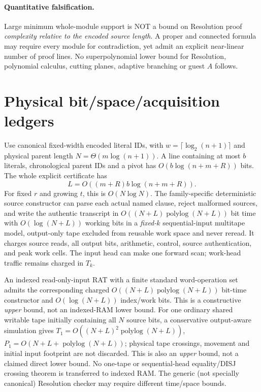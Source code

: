 \documentclass[11pt]{article}
\begin{document}
\paragraph{Quantitative falsification.}
Large minimum whole-module support is NOT a bound
on Resolution proof \emph{complexity relative to the
encoded source length}. A proper and connected
formula may require every module for contradiction,
yet admit an explicit near-linear number of proof lines.
No superpolynomial lower bound for Resolution,
polynomial calculus, cutting planes, adaptive branching
or guest $A$ follows.

\section{Physical bit/space/acquisition ledgers}
Use canonical fixed-width encoded literal IDs, with
$w=\lceil\log_2(n+1)\rceil$ and physical parent length
$N=\Theta(m\log(n+1))$.  A line containing at most
$b$ literals, chronological parent IDs and a pivot has
$O(b\log(n+m+R))$ bits. The whole explicit certificate has
\[
L=O((m+R)b\log(n+m+R)).
\tag{8}
\]
For fixed $r$ and growing $t$, this is $O(N\log N)$.
The family-specific deterministic source constructor can
parse each actual named clause, reject malformed sources,
and write the authentic transcript in
$O((N+L)\operatorname{polylog}(N+L))$ bit time with
$O(\log(N+L))$ working bits in a \emph{fixed-$k$}
sequential-input multitape model, output-only tape
excluded from reusable work space and never reread.
It charges source reads, all output bits, arithmetic,
control, source authentication, and peak work cells.
The input head can make one forward scan;
work-head traffic remains charged in $T_k$.

An indexed read-only-input RAT with a finite standard
word-operation set admits the corresponding charged
$O((N+L)\operatorname{polylog}(N+L))$ bit-time
constructor and $O(\log(N+L))$ index/work bits.
This is a constructive \emph{upper} bound, not an
indexed-RAM lower bound.
For one ordinary shared writable tape initially
containing all $N$ source bits, a conservative
output-aware simulation gives
$T_1=O((N+L)^2\operatorname{polylog}(N+L))$,
$P_1=O(N+L+\operatorname{polylog}(N+L))$;
physical tape crossings, movement and initial input
footprint are not discarded. This is also an
\emph{upper} bound, not a claimed direct lower bound.
No one-tape or sequential-head equality/DISJ
crossing theorem is transferred to indexed RAM.
The generic (not specially canonical) Resolution
checker may require different time/space bounds.
\end{document}
